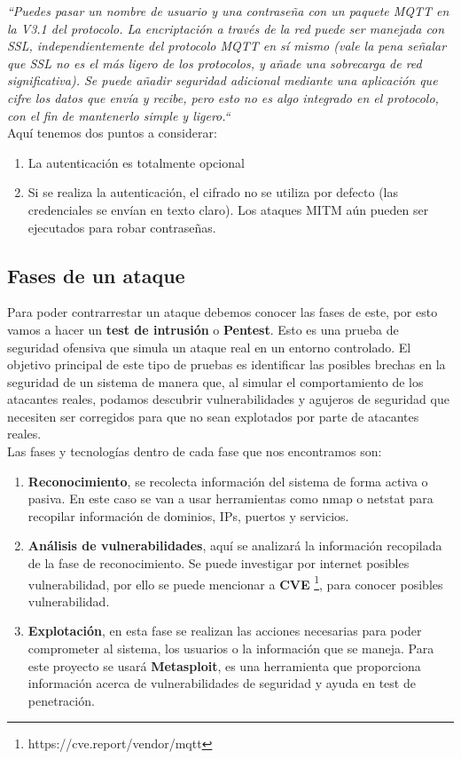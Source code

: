 {\textit{``Puedes pasar un nombre de usuario y una contraseña con un paquete MQTT en la V3.1 del protocolo. La encriptación a través de la red puede ser manejada con SSL, independientemente del protocolo MQTT en sí mismo (vale la pena señalar que SSL no es el más ligero de los protocolos, y añade una sobrecarga de red significativa). Se puede añadir seguridad adicional mediante una aplicación que cifre los datos que envía y recibe, pero esto no es algo integrado en el protocolo, con el fin de mantenerlo simple y ligero.``}\\

Aquí tenemos dos puntos a considerar:

\begin{enumerate}
    \item La autenticación es totalmente opcional
    \item Si se realiza la autenticación, el cifrado no se utiliza por defecto (las credenciales se envían en texto claro). Los ataques MITM aún pueden ser ejecutados para robar contraseñas.
\end{enumerate}

\subsection{Fases de un ataque}

Para poder contrarrestar un ataque debemos conocer las fases de este, por esto vamos a hacer un \textbf{test de intrusión} o \textbf{Pentest}. Esto es una prueba de seguridad ofensiva que simula un ataque real en un entorno controlado. El objetivo principal de este tipo de pruebas es identificar las posibles brechas en la seguridad de un sistema de manera que, al simular el comportamiento de los atacantes reales, podamos descubrir vulnerabilidades y agujeros de seguridad que necesiten ser corregidos para que no sean explotados por parte de atacantes reales. \cite{pentesting} \\

Las fases y tecnologías dentro de cada fase que nos encontramos son:

\begin{enumerate}
    \item \textbf{Reconocimiento}, se recolecta información del sistema de forma activa o pasiva. En este caso se van a usar herramientas como nmap o netstat para recopilar información de dominios, IPs, puertos y servicios.
    \item \textbf{Análisis de vulnerabilidades}, aquí se analizará la información recopilada de la fase de reconocimiento. Se puede investigar por internet posibles vulnerabilidad, por ello se puede mencionar a \textbf{CVE} \footnote{https://cve.report/vendor/mqtt}, para conocer posibles vulnerabilidad.
    \item \textbf{Explotación}, en esta fase se realizan las acciones necesarias para poder comprometer al sistema, los usuarios o la información que se maneja. Para este proyecto se usará \textbf{Metasploit}, es una herramienta que proporciona información acerca de vulnerabilidades de seguridad y ayuda en test de penetración.
\end{enumerate}

}